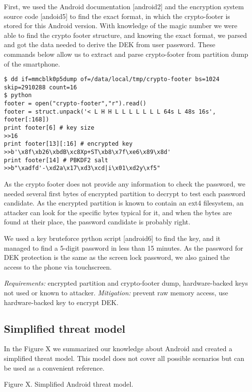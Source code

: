 First, we used the Android documentation [android2] and the encryption system source code [andoid5] to find the exact format, in which the crypto-footer is stored for this Android version. With knowledge of the magic number we were able to find the crypto footer structure, and knowing the exact format, we parsed and got the data needed to derive the DEK from user password. 
These commands below allow us to extract and parse crypto-footer from partition dump of the smartphone.

\begin{lstlisting}
$ dd if=mmcblk0p5dump of=/data/local/tmp/crypto-footer bs=1024 skip=2910288 count=16
$ python
footer = open("crypto-footer","r").read()
footer = struct.unpack('< L H H L L L L L L L 64s L 48s 16s', footer[:168])
print footer[6] # key size
>>16
print footer[13][:16] # encrypted key
>>b'\x8f\xb26\xbdB\xc8Xp+ST\xb8\x7f\xe6\x89\x8d'
print footer[14] # PBKDF2 salt
>>b"\xadfd'-\xd2a\x17\xd3\xcd|i\x01\xd2y\xf5"
\end{lstlisting}

As the crypto footer does not provide any information to check the password, we needed several first bytes of encrypted partition to decrypt to test each password candidate. As the encrypted partition is known to contain an ext4 filesystem, an attacker can look for the specific bytes typical for it, and when the bytes are found at their place, the password candidate is probably right.

We used a key bruteforce python script [android6] to find the key, and it managed to find a 5-digit password in less than 15 minutes. As the password for DEK protection is the same as the screen lock password, we also gained the access to the phone via touchscreen.

\textsl{Requirements:} encrypted partition and crypto-footer dump, hardware-backed keys not used or known to attacker.
\textsl{Mitigation:} prevent raw memory access, use hardware-backed key to encrypt DEK.


\subsection{Simplified threat model}

In the Figure X we summarized our knowledge about Android and created a simplified threat model. This model does not cover all possible scenarios but can be used as a convenient reference.

Figure X. Simplified Android threat model.


